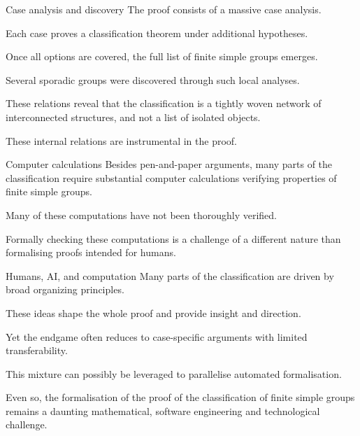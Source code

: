 \documentclass{beamer}
\begin{document}
\begin{frame}{Case analysis and discovery}
The proof consists of a massive case analysis.

\bigskip

Each case proves a classification theorem under additional hypotheses.

\bigskip

Once all options are covered, the full list of finite simple groups emerges.

\bigskip

Several sporadic groups were discovered through such local analyses.

\bigskip

These relations reveal that the classification is a tightly woven network of interconnected structures, and not a list of isolated objects.

\bigskip

These internal relations are instrumental in the proof.

\end{frame}

\begin{frame}{Computer calculations}
Besides pen-and-paper arguments, many parts of the classification require substantial computer calculations verifying properties of finite simple groups.

\bigskip

Many of these computations have not been thoroughly verified.

\bigskip

Formally checking these computations is a challenge of a different nature than formalising proofs intended for humans.
\end{frame}

\begin{frame}{Humans, AI, and computation}
Many parts of the classification are driven by broad organizing principles.

\bigskip

These ideas shape the whole proof and provide insight and direction.

\bigskip

Yet the endgame often reduces to case-specific arguments with limited transferability.

\bigskip

This mixture can possibly be leveraged to parallelise automated formalisation.

\bigskip

Even so, the formalisation of the proof of the classification of finite simple groups remains a daunting mathematical, software engineering and technological challenge.
\end{frame}
\end{document}
